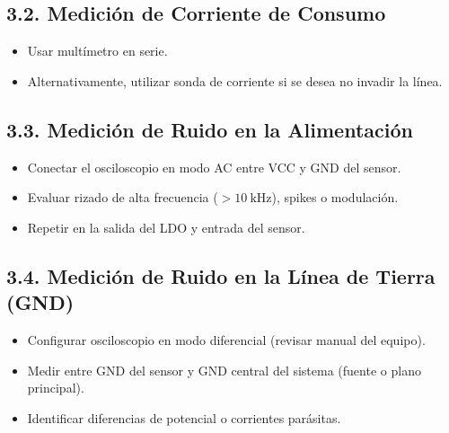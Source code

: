 \documentclass[12pt]{article}
\begin{document}
	\subsection*{3.2. Medición de Corriente de Consumo}
	\begin{itemize}
		\item Usar multímetro en serie.
		\item Alternativamente, utilizar sonda de corriente si se desea no invadir la línea.
	\end{itemize}
	
	\subsection*{3.3. Medición de Ruido en la Alimentación}
	\begin{itemize}
		\item Conectar el osciloscopio en modo AC entre VCC y GND del sensor.
		\item Evaluar rizado de alta frecuencia (\(> \SI{10}{\kilo\hertz}\)), spikes o modulación.
		\item Repetir en la salida del LDO y entrada del sensor.
	\end{itemize}
	
	\subsection*{3.4. Medición de Ruido en la Línea de Tierra (GND)}
	\begin{itemize}
		\item Configurar osciloscopio en modo diferencial (revisar manual del equipo).
		\item Medir entre GND del sensor y GND central del sistema (fuente o plano principal).
		\item Identificar diferencias de potencial o corrientes parásitas.
	\end{itemize}
\end{document}
